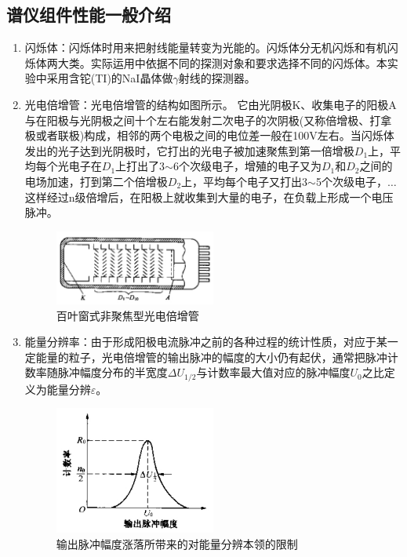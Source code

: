 \documentclass[a4paper]{article}
\begin{document}
\subsection{谱仪组件性能一般介绍}
\begin{enumerate}
	\item 闪烁体：闪烁体时用来把射线能量转变为光能的。闪烁体分无机闪烁和有机闪烁体两大类。实际运用中依据不同的探测对象和要求选择不同的闪烁体。本实验中采用含铊(TI)的NaI晶体做$\gamma$射线的探测器。
	\item 光电倍增管：光电倍增管的结构如图所示。
	      它由光阴极K、收集电子的阳极A与在阳极与光阴极之间十个左右能发射二次电子的次阴极(又称倍增极、打拿极或者联极)构成，相邻的两个电极之间的电位差一般在100V左右。当闪烁体发出的光子达到光阴极时，它打出的光电子被加速聚焦到第一倍增极$D_1$上，平均每个光电子在$D_1$上打出了3$\sim$6个次级电子，增殖的电子又为$D_1$和$D_2$之间的电场加速，打到第二个倍增极$D_2$上，平均每个电子又打出3$\sim$5个次级电子，$\dots$这样经过n级倍增后，在阳极上就收集到大量的电子，在负载上形成一个电压脉冲。
	      \begin{figure}[!h]
		      \centering
		      \includegraphics[width=0.5\textwidth]{fig/fig4.pdf}
		      \caption{百叶窗式非聚焦型光电倍增管}\label{fig4}
	      \end{figure}

	\item 能量分辨率：由于形成阳极电流脉冲之前的各种过程的统计性质，对应于某一定能量的粒子，光电倍增管的输出脉冲的幅度的大小仍有起伏，通常把脉冲计数率随脉冲幅度分布的半宽度$\Delta U_{1/2}$与计数率最大值对应的脉冲幅度$U_0$之比定义为能量分辨$\varepsilon$。
	      \begin{figure}[!h]
		      \centering
		      \includegraphics[width=0.5\textwidth]{fig/fig5.pdf}
		      \caption{输出脉冲幅度涨落所带来的对能量分辨本领的限制}\label{fig5}
	      \end{figure}


\end{enumerate}
\end{document}
